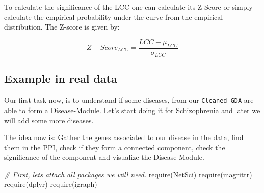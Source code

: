 \documentclass[
]{book}
\newenvironment{Shaded}{\begin{snugshade}}{\end{snugshade}}
\newcommand{\CommentTok}[1]{\textcolor[rgb]{0.56,0.35,0.01}{\textit{#1}}}
\newcommand{\FunctionTok}[1]{\textcolor[rgb]{0.00,0.00,0.00}{#1}}
\newcommand{\NormalTok}[1]{#1}
\newcommand{\OtherTok}[1]{\textcolor[rgb]{0.56,0.35,0.01}{#1}}
\newcommand{\SpecialCharTok}[1]{\textcolor[rgb]{0.00,0.00,0.00}{#1}}
\newcommand{\StringTok}[1]{\textcolor[rgb]{0.31,0.60,0.02}{#1}}
\begin{document}
To calculate the significance of the LCC one can calculate its Z-Score or simply calculate the empirical probability under the curve from the empirical distribution. The Z-score is given by:

\[
Z-Score_{LCC} = \frac{LCC - \mu_{LCC}}{\sigma_{LCC}}
\]

\hypertarget{example-in-real-data}{%
\subsection{Example in real data}\label{example-in-real-data}}

Our first task now, is to understand if some diseases, from our \texttt{Cleaned\_GDA} are able to form a Disease-Module. Let's start doing it for Schizophrenia and later we will add some more diseases.

The idea now is: Gather the genes associated to our disease in the data, find them in the PPI, check if they form a connected component, check the significance of the component and visualize the Disease-Module.

\begin{Shaded}
\begin{Highlighting}[]
\CommentTok{\# First, let\textquotesingle{}s attach all packages we will need.}
\FunctionTok{require}\NormalTok{(NetSci)}
\FunctionTok{require}\NormalTok{(magrittr)}
\FunctionTok{require}\NormalTok{(dplyr)}
\FunctionTok{require}\NormalTok{(igraph)}
\end{Highlighting}
\end{Shaded}

\begin{Shaded}
\end{Shaded}
\end{document}
